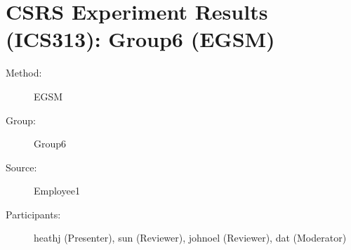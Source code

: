 
%          
\chapter {CSRS Experiment Results (ICS313): Group6 (EGSM)}
\small
	  
\begin{description}
\item [Method:] EGSM
\item [Group:] Group6
\item [Source:] Employee1
\item [Participants:] heathj (Presenter), sun (Reviewer), johnoel (Reviewer), dat (Moderator)
\end{description}
